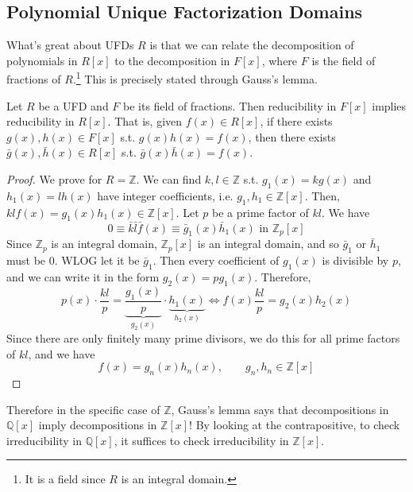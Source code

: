 \subsection{Polynomial Unique Factorization Domains}

  What's great about UFDs $R$ is that we can relate the decomposition of polynomials in $R[x]$ to the decomposition in $F[x]$, where $F$ is the field of fractions of $R$.\footnote{It is a field since $R$ is an integral domain.} This is precisely stated through Gauss's lemma. 

  \begin{lemma}
    Let $R$ be a UFD and $F$ be its field of fractions. Then reducibility in $F[x]$ implies reducibility in $R[x]$. That is, given $f(x) \in R[x]$, if there exists $g(x), h(x) \in F[x]$ s.t. $g(x) h(x) = f(x)$, then there exists $\bar{g}(x), \bar{h}(x) \in R[x]$ s.t. $\bar{g}(x) \bar{h}(x) = f(x)$. 
  \end{lemma}
  \begin{proof}
    We prove for $R = \mathbb{Z}$. We can find $k, l \in \mathbb{Z}$ s.t. $g_1 (x) = k g(x)$ and $h_1 (x) = l h(x)$ have integer coefficients, i.e. $g_1, h_1 \in \mathbb{Z}[x]$. Then, $k l f(x) = g_1 (x) h_1 (x) \in \mathbb{Z}[x]$. Let $p$ be a prime factor of $kl$. We have 
    \begin{equation}
      0 \equiv \bar{k} \bar{l} \bar{f} (x) \equiv \bar{g}_1 (x) \bar{h}_1 (x) \text{ in } \mathbb{Z}_p [x]
    \end{equation}
    Since $\mathbb{Z}_p$ is an integral domain, $\mathbb{Z}_p [x]$ is an integral domain, and so $\bar{g}_1$ or $\bar{h}_1$ must be $0$. WLOG let it be $\bar{g}_1$. Then every coefficient of $g_1 (x)$ is divisible by $p$, and we can write it in the form $g_2(x) = p g_1 (x)$. Therefore, 
    \begin{equation}
      p(x) \cdot \frac{kl}{p} = \underbrace{\frac{g_1 (x)}{p}}_{g_2 (x)} \cdot \underbrace{h_1 (x)}_{h_2 (x)} \iff f(x) \frac{kl}{p} = g_2 (x) h_2 (x)
    \end{equation}
    Since there are only finitely many prime divisors, we do this for all prime factors of $kl$, and we have 
    \begin{equation}
      f(x) = g_n (x) h_n (x), \qquad g_n, h_n \in \mathbb{Z}[x]
    \end{equation}
  \end{proof}

  Therefore in the specific case of $\mathbb{Z}$, Gauss's lemma says that decompositions in $\mathbb{Q}[x]$ imply decompositions in $\mathbb{Z}[x]$! By looking at the contrapositive, to check irreducibility in $\mathbb{Q}[x]$, it suffices to check irreducibility in $\mathbb{Z}[x]$. 

